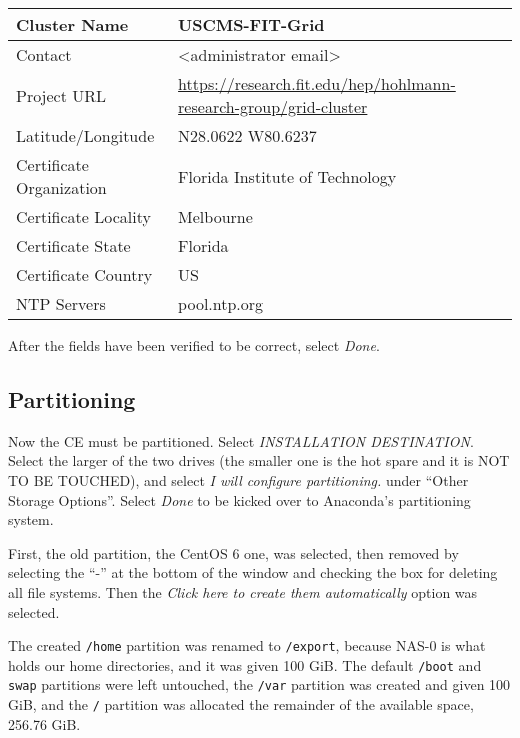 \documentclass[12pt]{article}
\begin{document}
\begin{center}
  \begin{tabular}{|l|l|}
    \hline
    Cluster Name & USCMS-FIT-Grid \\
    \hline
    Contact & \textless administrator email\textgreater \\
    \hline
    Project URL &
                  \url{https://research.fit.edu/hep/hohlmann-research-group/grid-cluster}
    \\
    \hline
    Latitude/Longitude & N28.0622 W80.6237 \\
    \hline
    Certificate Organization & Florida Institute of Technology \\
    \hline
    Certificate Locality & Melbourne \\
    \hline
    Certificate State & Florida \\
    \hline
    Certificate Country & US \\
    \hline
    NTP Servers & pool.ntp.org \\
    \hline
  \end{tabular}
\end{center}

After the fields have been verified to be correct, select \textit{Done}.

\subsection{Partitioning}

\qq Now the CE must be partitioned. Select \textit{INSTALLATION
  DESTINATION}. Select the larger of the two drives (the smaller one is the hot
spare and it is NOT TO BE TOUCHED), and select \textit{I will configure
  partitioning.} under ``Other Storage Options''. Select \textit{Done} to be
kicked over to Anaconda's partitioning system.

\qq First, the old partition, the CentOS 6 one, was selected, then removed by
selecting the ``-'' at the bottom of the window and checking the box for
deleting all file systems. Then the \textit{Click here to
  create them automatically} option was selected.

\qq The created {\tt /home} partition was renamed to {\tt /export}, because
NAS-0 is what holds our home directories, and it was given 100 GiB. The default
{\tt /boot} and {\tt swap} partitions were left untouched, the {\tt /var}
partition was created and given 100 GiB, and the {\tt /} partition was allocated
the remainder of the available space, 256.76 GiB.
\end{document}
